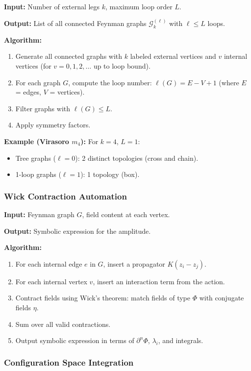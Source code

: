 \textbf{Input:} Number of external legs $k$, maximum loop order $L$.

\textbf{Output:} List of all connected Feynman graphs $\mathcal{G}_k^{(\ell)}$ with $\ell \leq L$ loops.

\textbf{Algorithm:}
\begin{enumerate}
\item Generate all connected graphs with $k$ labeled external vertices and $v$ internal vertices (for $v = 0, 1, 2, \ldots$ up to loop bound).
\item For each graph $G$, compute the loop number: $\ell(G) = E - V + 1$ (where $E$ = edges, $V$ = vertices).
\item Filter graphs with $\ell(G) \leq L$.
\item Apply symmetry factors.
\end{enumerate}

\textbf{Example (Virasoro $m_4$):}
For $k=4$, $L=1$:
\begin{itemize}
\item Tree graphs ($\ell=0$): 2 distinct topologies (cross and chain).
\item 1-loop graphs ($\ell=1$): 1 topology (box).
\end{itemize}

\subsubsection{Wick Contraction Automation}

\textbf{Input:} Feynman graph $G$, field content at each vertex.

\textbf{Output:} Symbolic expression for the amplitude.

\textbf{Algorithm:}
\begin{enumerate}
\item For each internal edge $e$ in $G$, insert a propagator $K(z_i - z_j)$.
\item For each internal vertex $v$, insert an interaction term from the action.
\item Contract fields using Wick's theorem: match fields of type $\Phi$ with conjugate fields $\eta$.
\item Sum over all valid contractions.
\item Output symbolic expression in terms of $\partial^n \Phi$, $\lambda_i$, and integrals.
\end{enumerate}

\subsubsection{Configuration Space Integration}

